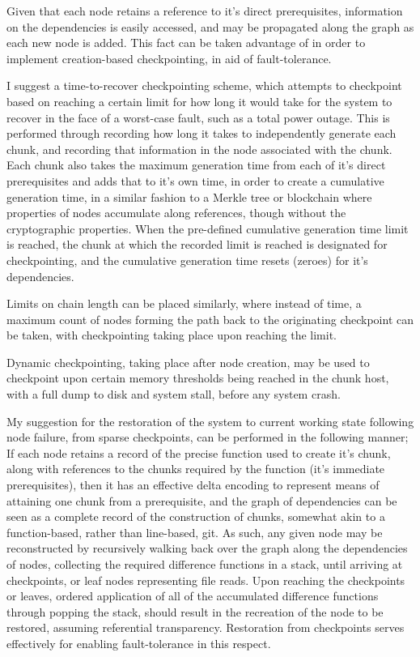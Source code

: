 \documentclass[10pt, a4paper]{article}
\begin{document}
Given that each node retains a reference to it's direct prerequisites, information on the dependencies is easily accessed, and may be propagated along the graph as each new node is added.
This fact can be taken advantage of in order to implement creation-based checkpointing, in aid of fault-tolerance.

I suggest a time-to-recover checkpointing scheme, which attempts to checkpoint based on reaching a certain limit for how long it would take for the system to recover in the face of a worst-case fault, such as a total power outage.
This is performed through recording how long it takes to independently generate each chunk, and recording that information in the node associated with the chunk.
Each chunk also takes the maximum generation time from each of it's direct prerequisites and adds that to it's own time, in order to create a cumulative generation time, in a similar fashion to a Merkle tree or blockchain where properties of nodes accumulate along references, though without the cryptographic properties\cite{merkle1988tree}\cite{nakamoto2008bitcoin}.
When the pre-defined cumulative generation time limit is reached, the chunk at which the recorded limit is reached is designated for checkpointing, and the cumulative generation time resets (zeroes) for it's dependencies.

Limits on chain length can be placed similarly, where instead of time, a maximum count of nodes forming the path back to the originating checkpoint can be taken, with checkpointing taking place upon reaching the limit.

Dynamic checkpointing, taking place after node creation, may be used to checkpoint upon certain memory thresholds being reached in the chunk host, with a full dump to disk and system stall, before any system crash.

My suggestion for the restoration of the system to current working state following node failure, from sparse checkpoints, can be performed in the following manner;
If each node retains a record of the precise function used to create it's chunk, along with references to the chunks required by the function (it's immediate prerequisites), then it has an effective delta encoding to represent means of attaining one chunk from a prerequisite, and the graph of dependencies can be seen as a complete record of the construction of chunks, somewhat akin to a function-based, rather than line-based, git\cite{chacon2014progit}.
As such, any given node may be reconstructed by recursively walking back over the graph along the dependencies of nodes, collecting the required difference functions in a stack, until arriving at checkpoints, or leaf nodes representing file reads.
Upon reaching the checkpoints or leaves, ordered application of all of the accumulated difference functions through popping the stack, should result in the recreation of the node to be restored, assuming referential transparency.
Restoration from checkpoints serves effectively for enabling fault-tolerance in this respect.
\end{document}

